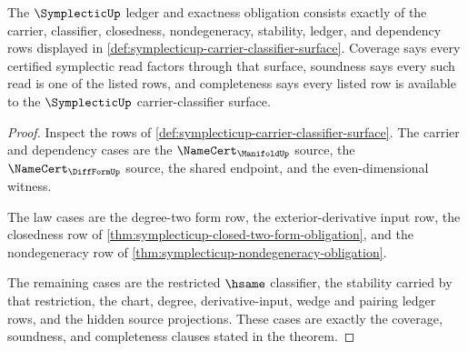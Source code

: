 \begin{theorem}
\label{thm:symplecticup-ledger-exactness-obligation}
The $\SymplecticUp$ ledger and exactness obligation consists exactly of the carrier, classifier, closedness, nondegeneracy, stability, ledger, and dependency rows displayed in \autoref{def:symplecticup-carrier-classifier-surface}. Coverage says every certified symplectic read factors through that surface, soundness says every such read is one of the listed rows, and completeness says every listed row is available to the $\SymplecticUp$ carrier-classifier surface.
\end{theorem}
\begin{proof}
Inspect the rows of \autoref{def:symplecticup-carrier-classifier-surface}. The carrier and dependency cases are the $\NameCert_{\ManifoldUp}$ source, the $\NameCert_{\DiffFormUp}$ source, the shared endpoint, and the even-dimensional witness.

The law cases are the degree-two form row, the exterior-derivative input row, the closedness row of \autoref{thm:symplecticup-closed-two-form-obligation}, and the nondegeneracy row of \autoref{thm:symplecticup-nondegeneracy-obligation}.

The remaining cases are the restricted $\hsame$ classifier, the stability carried by that restriction, the chart, degree, derivative-input, wedge and pairing ledger rows, and the hidden source projections. These cases are exactly the coverage, soundness, and completeness clauses stated in the theorem.
\end{proof}


